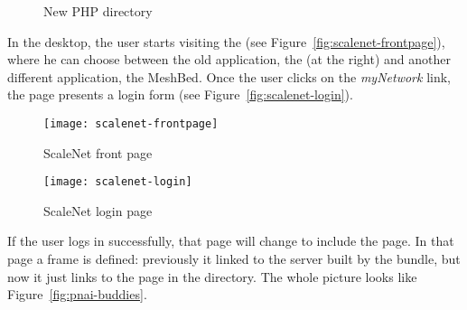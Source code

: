 \begin{figure}[htbp]
  \caption{New PHP directory}
  \label{fig:phpdir}
\end{figure}

In the desktop, the user starts visiting the  (see Figure~\vref{fig:scalenet-frontpage}), where he can choose between the old  application, the  (at the right) and another different application, the MeshBed.
Once the user clicks on the \emph{myNetwork} link, the  page presents a login form (see Figure~\vref{fig:scalenet-login}).

\begin{figure}[htbp]
  \centering
    \texttt{[image: scalenet-frontpage]}
  \caption{ScaleNet front page}
  \label{fig:scalenet-frontpage}
\end{figure}

\begin{figure}[htbp]
  \centering
    \texttt{[image: scalenet-login]}
  \caption{ScaleNet login page}
  \label{fig:scalenet-login}
\end{figure}

If the user logs in successfully, that page will change to include the  page.
In that page a frame is defined: previously it linked to the server built by the  bundle, but now it just links to the  page in the  directory.
The whole picture looks like Figure~\vref{fig:pnai-buddies}.

